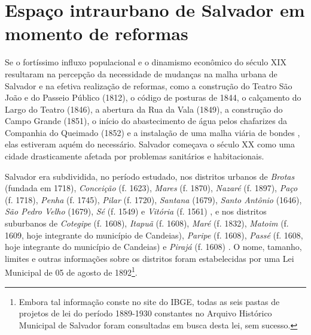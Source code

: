 \section{Espaço intraurbano de Salvador em momento de reformas}\label{sec:1.4}


Se o fortíssimo influxo populacional e o dinamismo econômico do século XIX resultaram na percepção da necessidade de mudanças na malha urbana de Salvador e na efetiva realização de reformas, como a construção do Teatro São João e do Passeio Público (1812), o código de posturas de 1844, o calçamento do Largo do Teatro (1846), a abertura da Rua da Vala (1849), a construção do Campo Grande (1851), o início do abastecimento de água pelos chafarizes da Companhia do Queimado (1852) e a instalação de uma malha viária de bondes \cite{fernandesgomes1992, fernandessampaiogomes1999, NASCIMENTO2007, sampaio_50_2005}, elas estiveram aquém do necessário. Salvador começava o século XX como uma cidade drasticamente afetada por problemas sanitários e habitacionais.

Salvador era subdividida, no período estudado, nos distritos urbanos de \textit{Brotas} (fundada em 1718), \textit{Conceição} (f. 1623), \textit{Mares} (f. 1870), \textit{Nazaré} (f. 1897), \textit{Paço} (f. 1718), \textit{Penha} (f. 1745), \textit{Pilar} (f. 1720), \textit{Santana} (1679), \textit{Santo Antônio }(1646), \textit{São Pedro Velho} (1679), \textit{Sé} (f. 1549) e \textit{Vitória} (f. 1561) \cite[259-307]{VASCONCELOS2002}, e nos distritos suburbanos de \textit{Cotegipe} (f. 1608), \textit{Itapuã} (f. 1608), \textit{Maré} (f. 1832), \textit{Matoim} (f. 1609, hoje integrante do município de Candeias), \textit{Paripe} (f. 1608), \textit{Passé} (f. 1608, hoje integrante do município de Candeias) e \textit{Pirajá} (f. 1608) \cite[p.~53-62]{NASCIMENTO2007}. O nome, tamanho, limites e outras informações sobre os distritos foram estabelecidas por uma Lei Municipal de 05 de agosto de 1892\footnote{Embora tal informação conste no site do IBGE, todas as seis pastas de projetos de lei do período 1889-1930 constantes no Arquivo Histórico Municipal de Salvador foram consultadas em busca desta lei, sem sucesso.}.


